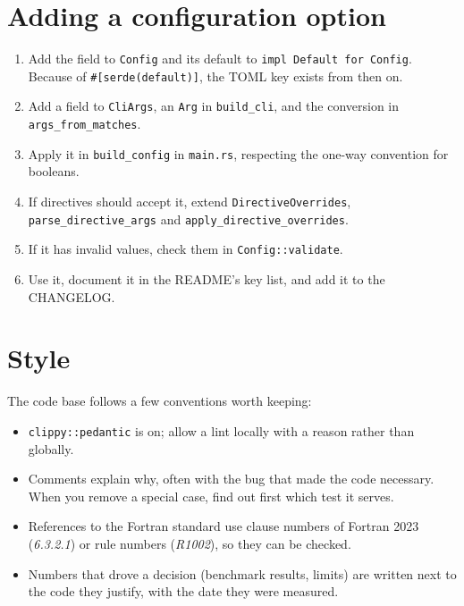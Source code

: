 \documentclass[11pt,a4paper,openany]{book}
\newcommand{\code}[1]{\texttt{\small #1}}
\newcommand{\file}[1]{\texttt{\small\color{accent}#1}}
\begin{document}
\section{Adding a configuration option}

\begin{enumerate}
  \item Add the field to \code{Config} and its default to
    \code{impl Default for Config}. Because of \code{\#[serde(default)]}, the
    TOML key exists from then on.
  \item Add a field to \code{CliArgs}, an \code{Arg} in \code{build\_cli}, and
    the conversion in \code{args\_from\_matches}.
  \item Apply it in \code{build\_config} in \file{main.rs}, respecting the
    one-way convention for booleans.
  \item If directives should accept it, extend \code{DirectiveOverrides},
    \code{parse\_directive\_args} and \code{apply\_directive\_overrides}.
  \item If it has invalid values, check them in \code{Config::validate}.
  \item Use it, document it in the README's key list, and add it to the CHANGELOG.
\end{enumerate}

\section{Style}

The code base follows a few conventions worth keeping:

\begin{itemize}
  \item \code{clippy::pedantic} is on; allow a lint locally with a reason
    rather than globally.
  \item Comments explain why, often with the bug that made the code necessary.
    When you remove a special case, find out first which test it serves.
  \item References to the Fortran standard use clause numbers of Fortran 2023
    (\emph{6.3.2.1}) or rule numbers (\emph{R1002}), so they can be checked.
  \item Numbers that drove a decision (benchmark results, limits) are written
    next to the code they justify, with the date they were measured.
\end{itemize}

\appendix
\end{document}
